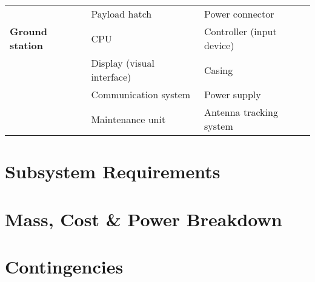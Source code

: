 \begin{table}[]
\begin{tabular}{l|ll}
\textbf{}               & Payload hatch              & Power connector               \\\hdashline
\textbf{Ground station} & CPU                        & Controller (input device)            \\
\textbf{}               & Display (visual interface) & Casing                        \\
                        & Communication system       & Power supply                  \\
                        & Maintenance unit           & Antenna tracking system       \\\hline
\end{tabular}
\end{table}






\section{Subsystem Requirements}
\label{sec:subs_requ}

\section{Mass, Cost \& Power Breakdown}
\label{sec:mass_cost_powe_brea}

\section{Contingencies}
\label{sec:cont}

